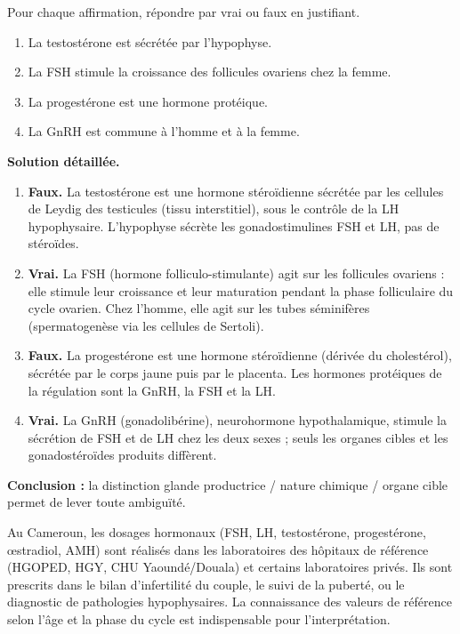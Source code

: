 \documentclass[11pt]{article}
\newcommand{\cle}[1]{{\popxbold\color{popdark}#1}}
\begin{document}
\begin{exoresolu}
Pour chaque affirmation, répondre par vrai ou faux en justifiant.
\begin{enumerate}
\item La testostérone est sécrétée par l'hypophyse.
\item La FSH stimule la croissance des follicules ovariens chez la femme.
\item La progestérone est une hormone protéique.
\item La GnRH est commune à l'homme et à la femme.
\end{enumerate}
\tcblower
\textbf{Solution détaillée.}
\begin{enumerate}
\item \textbf{Faux.} La testostérone est une hormone stéroïdienne sécrétée par les \cle{cellules de Leydig} des testicules (tissu interstitiel), sous le contrôle de la LH hypophysaire. L'hypophyse sécrète les gonadostimulines FSH et LH, pas de stéroïdes.
\item \textbf{Vrai.} La FSH (hormone folliculo-stimulante) agit sur les follicules ovariens : elle stimule leur croissance et leur maturation pendant la phase folliculaire du cycle ovarien. Chez l'homme, elle agit sur les tubes séminifères (spermatogenèse via les cellules de Sertoli).
\item \textbf{Faux.} La progestérone est une hormone \cle{stéroïdienne} (dérivée du cholestérol), sécrétée par le corps jaune puis par le placenta. Les hormones protéiques de la régulation sont la GnRH, la FSH et la LH.
\item \textbf{Vrai.} La GnRH (gonadolibérine), neurohormone hypothalamique, stimule la sécrétion de FSH et de LH chez les deux sexes ; seuls les organes cibles et les gonadostéroïdes produits diffèrent.
\end{enumerate}
\textbf{Conclusion :} la distinction glande productrice / nature chimique / organe cible permet de lever toute ambiguïté.
\end{exoresolu}

\begin{savaistu}
Au Cameroun, les dosages hormonaux (FSH, LH, testostérone, progestérone, \oe{}stradiol, AMH) sont réalisés dans les laboratoires des hôpitaux de référence (HGOPED, HGY, CHU Yaoundé/Douala) et certains laboratoires privés. Ils sont prescrits dans le bilan d'infertilité du couple, le suivi de la puberté, ou le diagnostic de pathologies hypophysaires. La connaissance des valeurs de référence selon l'âge et la phase du cycle est indispensable pour l'interprétation.
\end{savaistu}
\end{document}
